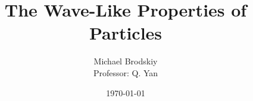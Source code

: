 


\title{The Wave-Like Properties of Particles}
\date{\today}
\author{Michael Brodskiy\\ \small Professor: Q. Yan}



\maketitle

\newpage

\tableofcontents

\newpage

